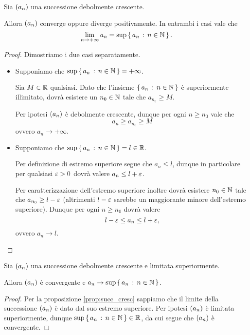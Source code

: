 \begin{proposition}
     \label{prop:succ_cresc}
    Sia $\seqn*{a}$ una successione debolmente crescente. 
    
    Allora $\seqn*{a}$ converge oppure diverge positivamente. In entrambi i casi vale che \[
        \lim_{n \to +\infty} a_n = \sup \left\{\,a_n \,:\, n \in \mathbb{N}\,\right\}.    
    \]
\end{proposition}
\begin{proof}
    Dimostriamo i due casi separatamente. \begin{itemize}
        \item Supponiamo che $\sup \left\{\,a_n \,:\, n \in \mathbb{N}\,\right\} = +\infty$. 
        
        Sia $M \in \mathbb{R}$ qualsiasi. Dato che l'insieme $\left\{\,a_n \,:\, n \in \mathbb{N}\,\right\}$ è superiormente illimitato, dovrà esistere un $n_0 \in \mathbb{N}$ tale che $a_{n_0} \geq M$.

        Per ipotesi $\seqn*{a}$ è debolmente crescente, dunque per ogni $n \geq n_0$ vale che \[
            a_n \geq a_{n_0} \geq M
        \] ovvero $a_n \to +\infty$.
        \item Supponiamo che $\sup \left\{\,a_n \,:\, n \in \mathbb{N}\,\right\} = l \in \mathbb{R}$. 
        
        Per definizione di estremo superiore segue che $a_n \leq l$, dunque in particolare per qualsiasi $\varepsilon > 0$ dovrà valere $a_n \leq l + \varepsilon$.

        Per caratterizzazione dell'estremo superiore inoltre dovrà esistere $n_0 \in \mathbb{N}$ tale che $a_{n_0} \geq l - \varepsilon$ (altrimenti $l - \varepsilon$ sarebbe un maggiorante minore dell'estremo superiore). Dunque per ogni $n \geq n_0$ dovrà valere \[
            l - \varepsilon \leq a_n \leq l + \varepsilon, 
        \] ovvero $a_n \to l$. \qedhere
    \end{itemize}
\end{proof}

\begin{corollary} \label{cor:succ_cresc_limit}
    Sia $\seqn*{a}$ una successione debolmente crescente e limitata superiormente. 
    
    Allora $\seqn*{a}$ è convergente e $a_n \to \sup \left\{\,a_n \,:\, n \in \mathbb{N}\,\right\}$.
\end{corollary}
\begin{proof}
    Per la proposizione \ref{prop:succ_cresc} sappiamo che il limite della successione $\seqn*{a}$ è dato dal suo estremo superiore. Per ipotesi $\seqn*{a}$ è limitata superiormente, dunque $\sup \left\{\,a_n \,:\, n \in \mathbb{N}\,\right\} \in \mathbb{R}$, da cui segue che $\seqn*{a}$ è convergente.
\end{proof}

